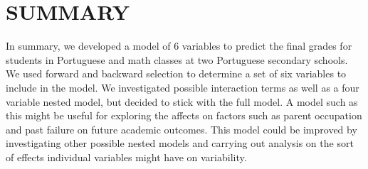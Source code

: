 \documentclass{article}
\begin{document}
\section{SUMMARY}
In summary, we developed a model of 6 variables to predict the final grades for students in Portuguese and math classes at two Portuguese secondary schools. We used forward and backward selection to determine a set of six variables to include in the model. We investigated possible interaction terms as well as a four variable nested model, but decided to stick with the full model. A model such as this might be useful for exploring the affects on factors such as parent occupation and past failure on future academic outcomes. This model could be improved by investigating other possible nested models and carrying out analysis on the sort of effects individual variables might have on variability. 
\end{document}
